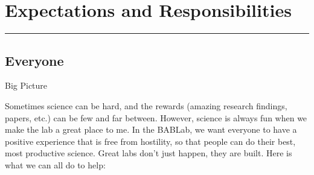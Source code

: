 \documentclass[]{book}
\begin{document}
\hypertarget{expectations-and-responsibilities}{%
\chapter{Expectations and Responsibilities}\label{expectations-and-responsibilities}}

\begin{center}\rule{0.5\linewidth}{0.5pt}\end{center}

\hypertarget{everyone}{%
\section{Everyone}\label{everyone}}

Big Picture

Sometimes science can be hard, and the rewards (amazing research findings, papers, etc.) can be few and far between. However, science is always fun when we make the lab a great place to me. In the BABLab, we want everyone to have a positive experience that is free from hostility, so that people can do their best, most productive science. Great labs don't just happen, they are built. Here is what we can all do to help:
\end{document}
